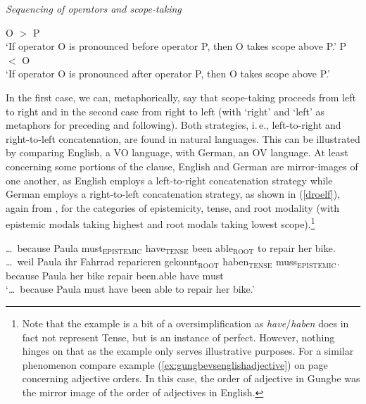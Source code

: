 \begin{exe} 
\ex \textit{Sequencing of operators and scope-taking} \label{beispielvierzehn} 
\begin{xlist} 
\ex 		O $>$ P \\ `If operator O is pronounced before operator P, then O takes scope above P.' \label{beispielvierzehna}
\ex P $<$ O \\ `If operator O is pronounced after operator P, then O takes scope above P.' \label{beispielvierzehnb} 
\end{xlist} 
\end{exe}

\noindent In the first case, we can, metaphorically, say that scope-taking proceeds from left to right and in the second case from right to left (with `right' and `left' as metaphors for preceding and following). Both strategies, i.\,e., left-to-right and right-to-left concatenation, are found in natural languages. This can be illustrated by comparing English, a VO language, with German, an OV language. At least concerning some portions of the clause, English and German are mirror-images of one another, as English employs a  left-to-right concatenation strategy while German employs a right-to-left concatenation strategy, as shown in (\ref{droelf}), again from \citet[11]{bross2017scope}, for the categories of epistemicity, tense, and root modality (with epistemic modals taking highest and root modals taking lowest scope).\footnote{ Note that the example is a bit of a oversimplification as \textit{have}/\textit{haben} does in fact not represent Tense, but is an instance of perfect. However, nothing hinges on that as the example only serves illustrative purposes. For a similar phenomenon compare example (\ref{ex:gungbevsenglishadjective}) on page \pageref{ex:gungbevsenglishadjective} concerning adjective orders. In this case, the order of adjective in Gungbe was the mirror image of the order of adjectives in English.}

\begin{exe} 
\ex \label{droelf}
\begin{xlist} 
\ex 	\dots\ because Paula must$_{\text{EPISTEMIC}}$ have$_{\text{TENSE}}$ been able$_{\text{ROOT}}$ to repair her bike.\label{beispieldreizehna}
\ex \gll \dots\ weil Paula ihr Fahrrad reparieren gekonnt$_{\text{ROOT}}$	haben$_{\text{TENSE}}$ muss$_{\text{EPISTEMIC}}$. \\
because Paula	her	bike		repair			been.able	  	have			must \\
\glt `\dots\ because Paula must have been able to repair her bike.'
 \label{beispieldreizehnb} 

\end{xlist} 
\end{exe}

